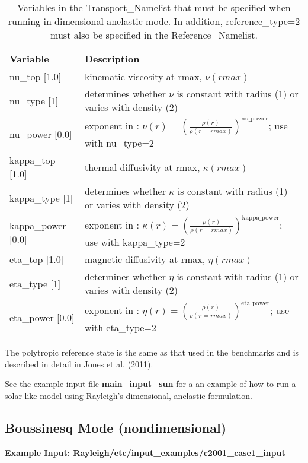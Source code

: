 \begin{table}
\centering
\begin{tabular}{| l | l |}
\hline
Variable & Description \\
\hline
nu\_top [1.0]   & kinematic viscosity at rmax, $\nu(rmax)$ \\
nu\_type [1]    & determines whether $\nu$ is constant with radius (1) or varies with density (2) \\
nu\_power [0.0] & exponent in : $\nu(r) = \left( \frac{\rho(r)}{\rho(r=rmax)} \right)^{\mathrm{nu\_power}}$; use with nu\_type=2 \\
\hline
kappa\_top [1.0]   & thermal diffusivity at rmax, $\kappa(rmax)$ \\
kappa\_type [1]    & determines whether $\kappa$ is constant with radius (1) or varies with density (2) \\
kappa\_power [0.0] & exponent in : $\kappa(r) = \left( \frac{\rho(r)}{\rho(r=rmax)} \right)^{\mathrm{kappa\_power}}$; use with kappa\_type=2 \\
\hline
eta\_top [1.0]   & magnetic diffusivity at rmax, $\eta(rmax)$ \\
eta\_type [1]    & determines whether $\eta$ is constant with radius (1) or varies with density (2) \\
eta\_power [0.0] & exponent in : $\eta(r) = \left( \frac{\rho(r)}{\rho(r=rmax)} \right)^{\mathrm{eta\_power}}$; use with eta\_type=2 \\
\hline
\end{tabular}
\caption{\label{table:anelastic_trans} Variables in the Transport\_Namelist that must be specified when running in dimensional anelastic mode. In addition, reference\_type=2 must also be specified in the Reference\_Namelist.}
\end{table}

The polytropic reference state is the same as that used in the benchmarks and is described in detail in Jones et al. (2011).

See the example input file \textbf{main\_input\_sun} for a an example of how to run a solar-like model using Rayleigh's dimensional, anelastic formulation.

\clearpage
\subsection{Boussinesq Mode (nondimensional)}

\textbf{Example Input:  Rayleigh/etc/input\_examples/c2001\_case1\_input}

